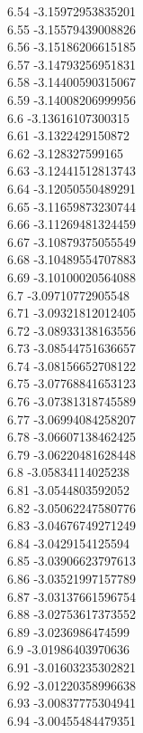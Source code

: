 {6.54	-3.15972953835201\\
6.55	-3.15579439008826\\
6.56	-3.15186206615185\\
6.57	-3.14793256951831\\
6.58	-3.14400590315067\\
6.59	-3.14008206999956\\
6.6	-3.13616107300315\\
6.61	-3.1322429150872\\
6.62	-3.128327599165\\
6.63	-3.12441512813743\\
6.64	-3.12050550489291\\
6.65	-3.11659873230744\\
6.66	-3.11269481324459\\
6.67	-3.10879375055549\\
6.68	-3.10489554707883\\
6.69	-3.10100020564088\\
6.7	-3.09710772905548\\
6.71	-3.09321812012405\\
6.72	-3.08933138163556\\
6.73	-3.08544751636657\\
6.74	-3.08156652708122\\
6.75	-3.07768841653123\\
6.76	-3.07381318745589\\
6.77	-3.06994084258207\\
6.78	-3.06607138462425\\
6.79	-3.06220481628448\\
6.8	-3.05834114025238\\
6.81	-3.0544803592052\\
6.82	-3.05062247580776\\
6.83	-3.04676749271249\\
6.84	-3.0429154125594\\
6.85	-3.03906623797613\\
6.86	-3.03521997157789\\
6.87	-3.03137661596754\\
6.88	-3.02753617373552\\
6.89	-3.0236986474599\\
6.9	-3.01986403970636\\
6.91	-3.01603235302821\\
6.92	-3.01220358996638\\
6.93	-3.00837775304941\\
6.94	-3.00455484479351\\
}
